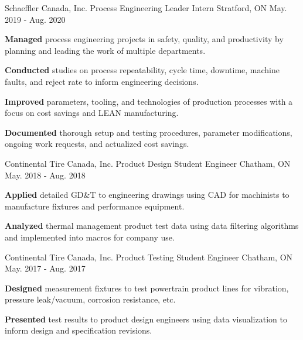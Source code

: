 \begin{cventries}
  \cventry
  {Schaeffler Canada, Inc.} %
  {Process Engineering Leader Intern} %
    {Stratford, ON} %
    {May. 2019 - Aug. 2020} %
    {
      \begin{cvitems} %
        \item {\textbf{Managed} process engineering projects in safety, quality, and productivity by planning and leading the work of multiple departments.}
        \item {\textbf{Conducted} studies on process repeatability, cycle time, downtime, machine faults, and reject rate to inform engineering decisions.}
        \item {\textbf{Improved} parameters, tooling, and technologies of production processes with a focus on cost savings and LEAN manufacturing.}
        \item {\textbf{Documented} thorough setup and testing procedures, parameter modifications, ongoing work requests, and actualized cost savings.}
      \end{cvitems}
    }
    

  \cventry
  {Continental Tire Canada, Inc.} %
  {Product Design Student Engineer} %
    {Chatham, ON} %
    {May. 2018 - Aug. 2018} %
    {
      \begin{cvitems} %
        \item{\textbf{Applied} detailed GD\&T to engineering drawings using CAD for machinists to manufacture fixtures and performance equipment.}
        \item{\textbf{Analyzed} thermal management product test data using data filtering algorithms and implemented into macros for company use.}
      \end{cvitems}
    }
    

  \cventry
  {Continental Tire Canada, Inc.} %
  {Product Testing Student Engineer} %
    {Chatham, ON} %
    {May. 2017 - Aug. 2017} %
    {
      \begin{cvitems} %
        \item {\textbf{Designed} measurement fixtures to test powertrain product lines for vibration, pressure leak/vacuum, corrosion resistance, etc.}
        \item {\textbf{Presented} test results to product design engineers using data visualization to inform design and specification revisions.}
      \end{cvitems}
    }
    
\end{cventries}
